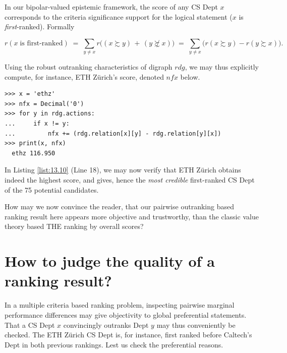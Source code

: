In our bipolar-valued epistemic framework, the \NetFlows score of any CS Dept $x$ corresponds to the criteria significance support for the logical statement ($x$ is \emph{first}-ranked). Formally 

\begin{equation}
  r(x \; \text{is first-ranked}) \; = \; \sum_{y \neq x} r\big((x \succsim y) \,+\, (y \not\succsim x)\big) \;=\; \sum_{y \neq x} \big(r(x \succsim y) - r(y \succsim x)\big).
\end{equation}

Using the robust outranking characteristics of digraph $rdg$, we may thus explicitly compute, for instance, ETH Zürich's score, denoted $nfx$ below.

\begin{lstlisting}
>>> x = 'ethz'
>>> nfx = Decimal('0')
>>> for y in rdg.actions:
...     if x != y:
...         nfx += (rdg.relation[x][y] - rdg.relation[y][x])  
>>> print(x, nfx)
  ethz 116.950
\end{lstlisting}

In Listing \ref{list:13.10} (Line 18), we may now verify that ETH Zürich obtains indeed the highest \NetFlows score, and gives, hence the \emph{most credible} first-ranked CS Dept of the 75 potential candidates.

How may we now convince the reader, that our pairwise outranking based ranking result here appears more objective and trustworthy, than the classic value theory based THE ranking by overall scores?  

\section{How to judge the quality of a ranking result?}
\label{sec:13.3}

In a multiple criteria based ranking problem, inspecting pairwise marginal performance differences may give objectivity to global preferential statements. That a CS Dept $x$ convincingly outranks Dept $y$ may thus conveniently be checked. The ETH Zürich CS Dept is, for instance, first ranked before Caltech's Dept in both previous rankings. Lest us check the preferential reasons.

